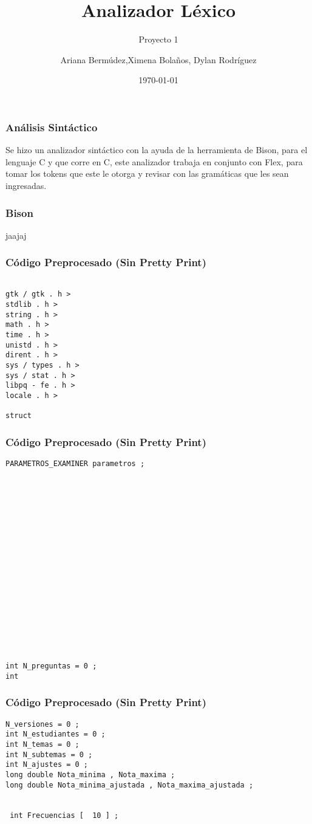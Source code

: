 \documentclass{beamer}
\title{Analizador L\'exico}
\subtitle{Proyecto 1}
\author{Ariana Berm\'udez,Ximena Bola\~nos, Dylan Rodr\'iguez}
\institute{Instituto Tecnol\'ogico de Costa Rica}
\date{\today}
\begin{document}
\begin{frame}
 \titlepage 
 \end{frame}\begin{frame}
 \frametitle{An\'alisis Sint\'actico}
  Se hizo un analizador sint\'actico con la ayuda de la herramienta de Bison, para el lenguaje C y que corre en C, este analizador trabaja en conjunto con Flex, para tomar los tokens que este le otorga y revisar con las gram\'aticas que les sean ingresadas.\end{frame}\begin{frame}
 \frametitle{Bison}
 jaajaj\end{frame}\begin{frame}[fragile]
\frametitle{C\'odigo Preprocesado (Sin Pretty Print)}
\begin{lstlisting}[style=CStyle]

gtk / gtk . h > 
stdlib . h > 
string . h > 
math . h > 
time . h > 
unistd . h > 
dirent . h > 
sys / types . h > 
sys / stat . h > 
libpq - fe . h > 
locale . h > 

struct \end{lstlisting}
\end{frame}
\begin{frame}[fragile]
\frametitle{C\'odigo Preprocesado (Sin Pretty Print)}
\begin{lstlisting}[style=CStyle]
PARAMETROS_EXAMINER parametros ; 


 


 

 

 

 


 

 

 
int N_preguntas = 0 ; 
int \end{lstlisting}
\end{frame}
\begin{frame}[fragile]
\frametitle{C\'odigo Preprocesado (Sin Pretty Print)}
\begin{lstlisting}[style=CStyle]
N_versiones = 0 ; 
int N_estudiantes = 0 ; 
int N_temas = 0 ; 
int N_subtemas = 0 ; 
int N_ajustes = 0 ; 
long double Nota_minima , Nota_maxima ; 
long double Nota_minima_ajustada , Nota_maxima_ajustada ; 


 int Frecuencias [  10 ] ; 


 


 

 \end{lstlisting}
\end{frame}
\end{document}
